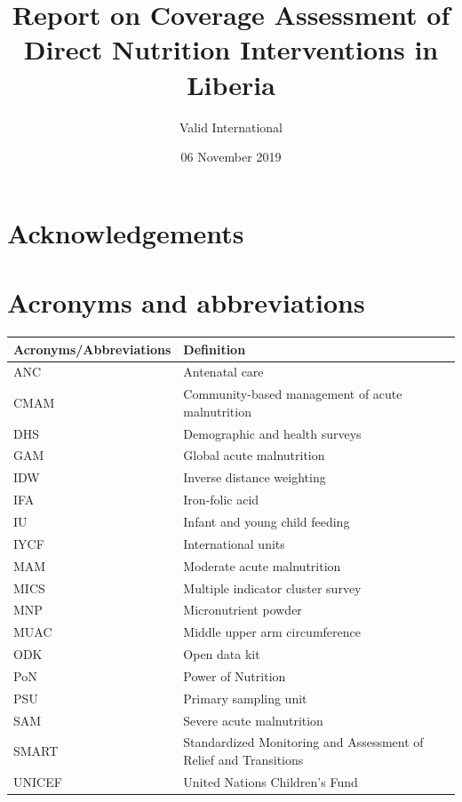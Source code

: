 \documentclass[12pt,a4paper]{article}
\title{\vspace{3.5in}Report on Coverage Assessment of Direct Nutrition Interventions in Liberia}
\author{Valid International}
\date{06 November 2019}
\begin{document}
\maketitle

\newpage

{
\hypersetup{linkcolor=black}
\setcounter{tocdepth}{3}
\tableofcontents
}
\listoftables
\listoffigures
\newpage

\hypertarget{acknowledgements}{%
\section*{Acknowledgements}\label{acknowledgements}}

\newpage

\hypertarget{acronyms-and-abbreviations}{%
\section*{Acronyms and abbreviations}\label{acronyms-and-abbreviations}}

\begin{longtable}{ll}
\toprule
\textbf{Acronyms/Abbreviations} & \textbf{Definition}\\
\midrule
ANC & Antenatal care\\
CMAM & Community-based management of acute malnutrition\\
DHS & Demographic and health surveys\\
GAM & Global acute malnutrition\\
IDW & Inverse distance weighting\\
\addlinespace
IFA & Iron-folic acid\\
IU & Infant and young child feeding\\
IYCF & International units\\
MAM & Moderate acute malnutrition\\
MICS & Multiple indicator cluster survey\\
\addlinespace
MNP & Micronutrient powder\\
MUAC & Middle upper arm circumference\\
ODK & Open data kit\\
PoN & Power of Nutrition\\
PSU & Primary sampling unit\\
\addlinespace
SAM & Severe acute malnutrition\\
SMART & Standardized Monitoring and Assessment of Relief and Transitions\\
UNICEF & United Nations Children's Fund\\
\bottomrule
\end{longtable}
\end{document}
